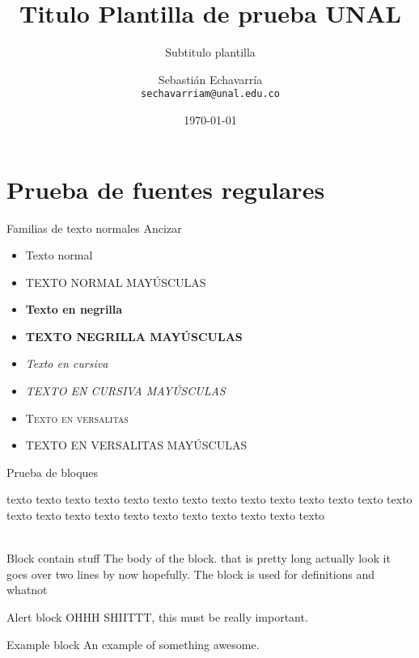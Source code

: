 \documentclass[]{beamer} %
\title{Titulo Plantilla de prueba UNAL}
\subtitle{Subtitulo plantilla}
\date[ISPN ’80]{\today}
\author[Sebasti\'an Echavarr\'ia ]{Sebasti\'an Echavarr\'ia\\ \texttt{\color{Azul2}sechavarriam@unal.edu.co}}
\institute[]{Facultad de Minas - Departamento de Ingeniería Civil - Sede Medellín}
\begin{document}
	
	\begin{frame}\end{frame} %
	
	
	\begin{frame} %
		\titlepage
	\end{frame}

\begin{frame} 
	\tableofcontents[pausesections]
\end{frame}


\section{Prueba de fuentes regulares}

\begin{frame}{Familias de texto normales Ancizar}
	\begin{itemize}
	\item  Texto normal\\
	\item  TEXTO NORMAL MAYÚSCULAS\\
	\item  \textbf{Texto en negrilla}\\
	\item  \textbf{TEXTO NEGRILLA MAYÚSCULAS}\\
	\item  \textit{Texto en cursiva}\\
	\item  \textit{TEXTO EN CURSIVA MAYÚSCULAS}\\
	\item  \textsc{Texto en versalitas}\\
	\item  \textsc{TEXTO EN VERSALITAS MAYÚSCULAS}
	\end{itemize}
	
\end{frame}

\begin{frame}{Prueba de bloques}
	
	texto texto texto texto texto texto texto texto texto texto texto texto texto texto texto texto texto texto texto texto texto texto texto texto texto\\~\\
	 
	\begin{block}{Block contain stuff}
		The body of the block. that is pretty long actually look it goes over two lines by now hopefully. The block is used for definitions and whatnot
	\end{block}
	\begin{alertblock}{Alert block}
		OHHH SHIITTT, this must be really important.
	\end{alertblock}
	\begin{exampleblock}{Example block}
		An example of something awesome.
	\end{exampleblock}
\end{frame}
\end{document}
